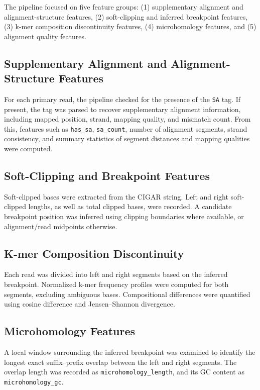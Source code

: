The pipeline focused on five feature groups: (1) supplementary alignment and alignment-structure features, (2) soft-clipping and inferred breakpoint features, (3) k-mer composition discontinuity features, (4) microhomology features, and (5) alignment quality features.

\subsection{Supplementary Alignment and Alignment-Structure Features}

For each primary read, the pipeline checked for the presence of the \texttt{SA} tag. If present, the tag was parsed to recover supplementary alignment information, including mapped position, strand, mapping quality, and mismatch count. From this, features such as \texttt{has\_sa}, \texttt{sa\_count}, number of alignment segments, strand consistency, and summary statistics of segment distances and mapping qualities were computed.

\subsection{Soft-Clipping and Breakpoint Features}

Soft-clipped bases were extracted from the CIGAR string. Left and right soft-clipped lengths, as well as total clipped bases, were recorded. A candidate breakpoint position was inferred using clipping boundaries where available, or alignment/read midpoints otherwise.

\subsection{K-mer Composition Discontinuity}

Each read was divided into left and right segments based on the inferred breakpoint. Normalized k-mer frequency profiles were computed for both segments, excluding ambiguous bases. Compositional differences were quantified using cosine difference and Jensen--Shannon divergence.

\subsection{Microhomology Features}

A local window surrounding the inferred breakpoint was examined to identify the longest exact suffix--prefix overlap between the left and right segments. The overlap length was recorded as \texttt{microhomology\_length}, and its GC content as \texttt{microhomology\_gc}.

